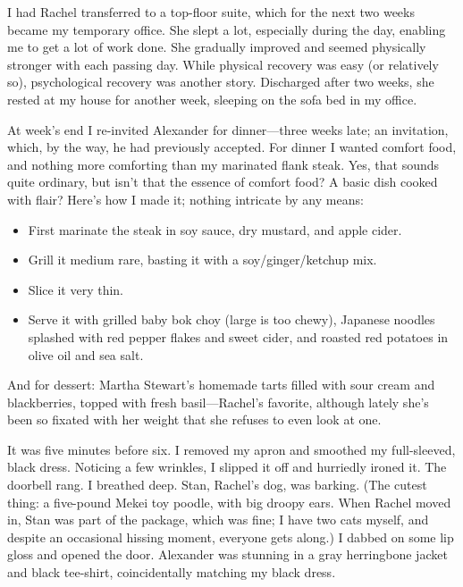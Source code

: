 \titlemark

I had Rachel transferred to a top-floor suite, which for the next two
weeks became my temporary office. She slept a lot, especially during the
day, enabling me to get a lot of work done. She gradually improved and
seemed physically stronger with each passing day. While physical
recovery was easy (or relatively so), psychological recovery was another
story. Discharged after two weeks, she rested at my house for another
week, sleeping on the sofa bed in my office.

At week's end I re-invited Alexander for dinner---three weeks late; an
invitation, which, by the way, he had previously accepted. For dinner I
wanted comfort food, and nothing more comforting than my marinated flank
steak. Yes, that sounds quite ordinary, but isn't that the essence of
comfort food? A basic dish cooked with flair? Here's how I made it;
nothing intricate by any means:

\begin{itemize}
\tightlist
\item
  First marinate the steak in soy sauce, dry mustard, and apple cider.
\item
  Grill it medium rare, basting it with a soy/ginger/ketchup mix.
\item
  Slice it very thin.
\item
  Serve it with grilled baby bok choy (large is too chewy), Japanese
  noodles splashed with red pepper flakes and sweet cider, and roasted
  red potatoes in olive oil and sea salt.
\end{itemize}

And for dessert: Martha Stewart's homemade tarts filled with sour cream
and blackberries, topped with fresh basil---Rachel's favorite, although
lately she's been so fixated with her weight that she refuses to even
look at one.

It was five minutes before six. I removed my apron and smoothed my
full-sleeved, black dress. Noticing a few wrinkles, I slipped it off and
hurriedly ironed it. The doorbell rang. I breathed deep. Stan, Rachel's
dog, was barking. (The cutest thing: a five-pound Mekei toy poodle, with
big droopy ears. When Rachel moved in, Stan was part of the package,
which was fine; I have two cats myself, and despite an occasional
hissing moment, everyone gets along.) I dabbed on some lip gloss and
opened the door. Alexander was stunning in a gray herringbone jacket and
black tee-shirt, coincidentally matching my black dress.

